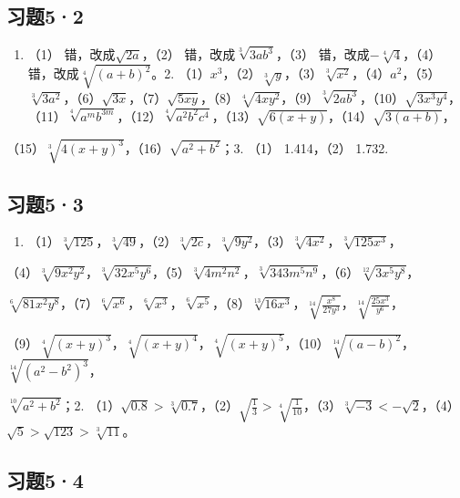 \subsection{习题5·2}

\begin{enumerate}
\item
  （1） 错，改成\(\sqrt{2a}\)，（2） 错，改成\(\sqrt[3]{3ab^3}\)，（3）
  错，改成\(-\sqrt[4]{4}\)，（4） 错，改成\(\sqrt[4]{(a+b)^2}\)。2.
  （1）\(x^3\)，（2）\(\sqrt[3]{y}\)，（3）\(\sqrt[3]{x^2}\)，（4）\(a^2\)，（5）\(\sqrt[3]{3a^2}\)，（6）\(\sqrt{3x}\)，（7）\(\sqrt{5xy}\)，（8）\(\sqrt[4]{4xy^2}\)，（9）\(\sqrt[3]{2ab^3}\)，（10）\(\sqrt{3x^3y^4}\)，（11）\(\sqrt[4]{a^m b^{3m}}\)，（12）\(\sqrt[4]{a^2b^2c^4}\)，（13）\(\sqrt{6(x+y)}\)，（14）\(\sqrt{3(a+b)}\)，
\end{enumerate}

（15）\(\sqrt[3]{4(x + y)^3}\)，（16）\(\sqrt{a^2 + b^2}\)；3. （1）
1.414，（2） 1.732.

\subsection{习题5·3}

\begin{enumerate}
\item
  （1）\(\sqrt[3]{125}\)，\(\sqrt[3]{49}\)，（2）\(\sqrt[3]{2c}\)，\(\sqrt[3]{9y^2}\)，（3）\(\sqrt[3]{4x^2}\)，\(\sqrt[3]{125x^3}\)，
\end{enumerate}

（4）\(\sqrt[3]{9x^2y^2}\)，\(\sqrt[3]{32x^5y^6}\)，（5）\(\sqrt[3]{4m^2n^2}\)，\(\sqrt[3]{343m^5n^9}\)，（6）\(\sqrt[12]{3x^5y^8}\)，

\(\sqrt[6]{81x^2y^8}\)，（7）\(\sqrt[6]{x^6}\)，\(\sqrt[6]{x^3}\)，\(\sqrt[6]{x^5}\)，（8）\(\sqrt[13]{16x^3}\)，\(\sqrt[14]{\frac{x^8}{27y^3}}\)，\(\sqrt[14]{\frac{25x^3}{y^6}}\)，

（9）\(\sqrt[4]{(x + y)^3}\)，\(\sqrt[4]{(x + y)^4}\)，\(\sqrt[4]{(x + y)^5}\)，（10）\(\sqrt[14]{(a - b)^2}\)，\(\sqrt[14]{(a^2 - b^2)^3}\)，

\(\sqrt[10]{a^{2}+b^{2}}\)；2.
（1）\(\sqrt{0.8}>\sqrt[3]{0.7}\)，（2）\(\sqrt{\frac{1}{3}}>\sqrt[4]{\frac{1}{10}}\)，（3）\(\sqrt[3]{-3}<-\sqrt{2}\)，（4）\(\sqrt{5}>\sqrt{123}>\sqrt[3]{11}\)。

\subsection{习题5·4}

